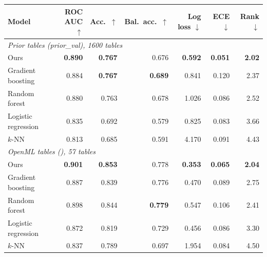 \begin{tabular}{lrrrrrr}
\toprule
Model & ROC AUC $\uparrow$ & Acc.\ $\uparrow$ & Bal.\ acc.\ $\uparrow$ & Log loss $\downarrow$ & ECE $\downarrow$ & Rank $\downarrow$ \\
\midrule
\multicolumn{7}{l}{\emph{Prior tables (\textit{prior\_val}), 1600 tables}} \\
Ours & \textbf{0.890} & \textbf{0.767} & 0.676 & \textbf{0.592} & \textbf{0.051} & \textbf{2.02} \\
Gradient boosting & 0.884 & \textbf{0.767} & \textbf{0.689} & 0.841 & 0.120 & 2.37 \\
Random forest & 0.880 & 0.763 & 0.678 & 1.026 & 0.086 & 2.52 \\
Logistic regression & 0.835 & 0.692 & 0.579 & 0.825 & 0.083 & 3.66 \\
$k$-NN & 0.813 & 0.685 & 0.591 & 4.170 & 0.091 & 4.43 \\
\midrule
\multicolumn{7}{l}{\emph{OpenML tables (\tabpfnval{}), 57 tables}} \\
Ours & \textbf{0.901} & \textbf{0.853} & 0.778 & \textbf{0.353} & \textbf{0.065} & \textbf{2.04} \\
Gradient boosting & 0.887 & 0.839 & 0.776 & 0.470 & 0.089 & 2.75 \\
Random forest & 0.898 & 0.844 & \textbf{0.779} & 0.547 & 0.106 & 2.41 \\
Logistic regression & 0.872 & 0.819 & 0.729 & 0.456 & 0.086 & 3.30 \\
$k$-NN & 0.837 & 0.789 & 0.697 & 1.954 & 0.084 & 4.50 \\
\bottomrule
\end{tabular}
